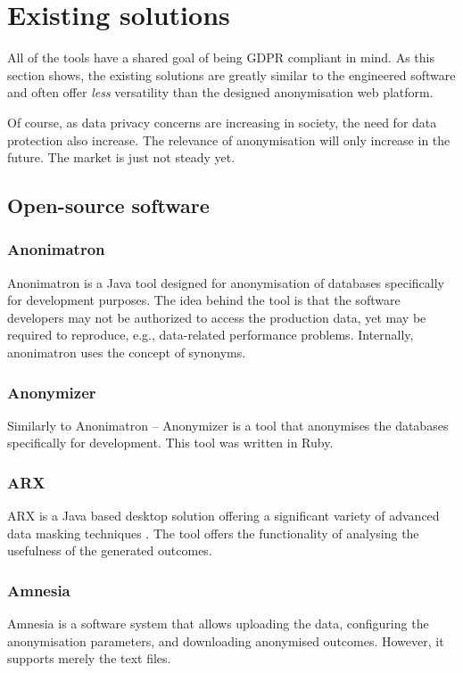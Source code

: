 \documentclass[a4paper,twoside,12pt]{book}
\begin{document}
\section{Existing solutions}

All of the tools have a shared goal of being GDPR compliant in mind. As this section shows, the existing solutions are greatly similar to the engineered software and often offer \textit{less} versatility than the designed anonymisation web platform.

Of course, as data privacy concerns are increasing in society, the need for data protection also increase. The relevance of anonymisation will only increase in the future. The market is just not steady yet.

\subsection{Open-source software}

\subsubsection{Anonimatron}
Anonimatron \cite{bib:anonimatron} is a Java tool designed for anonymisation of databases specifically for development purposes. The idea behind the tool is that the software developers may not be authorized to access the production data, yet may be required to reproduce, e.g., data-related performance problems. Internally, anonimatron uses the concept of synonyms.


\subsubsection{Anonymizer}
Similarly to Anonimatron -- Anonymizer \cite{bib:anonymizer} is a tool that anonymises the databases specifically for development. This tool was written in Ruby.

\subsubsection{ARX}
ARX \cite{bib:arx_docs} is a Java based desktop solution offering a significant variety of advanced data masking techniques \cite{bib:arx_article}. The tool offers the functionality of analysing the usefulness of the generated outcomes.

\subsubsection{Amnesia}
Amnesia \cite{bib:amnesia} is a software system that allows uploading the data, configuring the anonymisation parameters, and downloading anonymised outcomes. However, it supports merely the text files.
\end{document}

